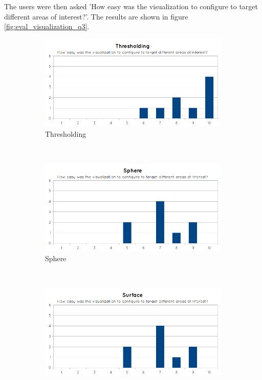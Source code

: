 The users were then asked 'How easy was the visualization to configure to target different areas of interest?'. The results are shown in figure \ref{fig:eval_visualization_q3}.

\begin{figure}[H]
  \centering
  \begin{subfigure}[b]{0.32\textwidth}
    \includegraphics[width=\textwidth]{images/evaluation/graph_thresholding_3.png}
    \caption*{Thresholding}
    \label{fig:eval_visualization_q3_thresholding}
  \end{subfigure}%
  ~ %
  \begin{subfigure}[b]{0.32\textwidth}
    \includegraphics[width=\textwidth]{images/evaluation/graph_sphere_3.png}
    \caption*{Sphere}
    \label{fig:eval_visualization_q3_sphere}
  \end{subfigure}%
  ~ %
  \begin{subfigure}[b]{0.32\textwidth}
    \includegraphics[width=\textwidth]{images/evaluation/graph_surface_3.png}

\end{subfigure}
\end{figure}
